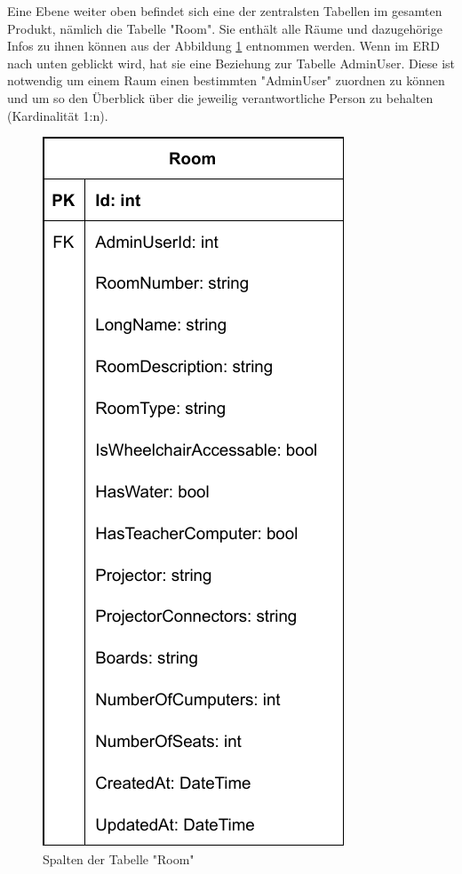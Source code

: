 
Eine Ebene weiter oben befindet sich eine der zentralsten Tabellen im gesamten Produkt, nämlich die Tabelle "Room". Sie enthält alle Räume und dazugehörige Infos zu ihnen können aus der Abbildung \ref{fig:RoomTableColls} entnommen werden. Wenn im ERD nach unten geblickt wird, hat sie eine Beziehung zur Tabelle AdminUser. Diese ist notwendig um einem Raum einen bestimmten "AdminUser" zuordnen zu können und um so den Überblick über die jeweilig verantwortliche Person zu behalten (Kardinalität 1:n).

\begin{figure}[H]
    \centering
    \includegraphics{media/MariaDB/Room.svg.pdf}
    \caption{Spalten der Tabelle "Room"}
    \label{fig:RoomTableColls}
\end{figure}


